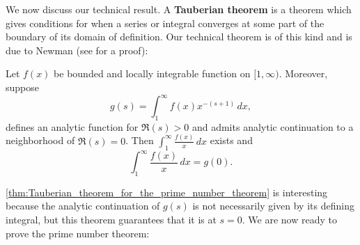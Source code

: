       We now discuss our technical result. A \textbf{Tauberian theorem} is a theorem which gives conditions for when a series or integral converges at some part of the boundary of its domain of definition. Our technical theorem is of this kind and is due to Newman (see \cite{murty2015simple} for a proof):

      \begin{theorem}\label{thm:Tauberian_theorem_for_the_prime_number_theorem}
        Let $f(x)$ be bounded and locally integrable function on $[1,\infty)$. Moreover, suppose
        \[
          g(s) = \int_{1}^{\infty}f(x)x^{-(s+1)}\,dx,
        \]
        defines an analytic function for $\Re(s) > 0$ and admits analytic continuation to a neighborhood of $\Re(s) = 0$. Then $\int_{1}^{\infty}\frac{f(x)}{x}\,dx$ exists and
        \[
          \int_{1}^{\infty}\frac{f(x)}{x}\,dx = g(0).
        \]
      \end{theorem}

      \cref{thm:Tauberian_theorem_for_the_prime_number_theorem} is interesting because the analytic continuation of $g(s)$ is not necessarily given by its defining integral, but this theorem guarantees that it is at $s = 0$. We are now ready to prove the prime number theorem:

